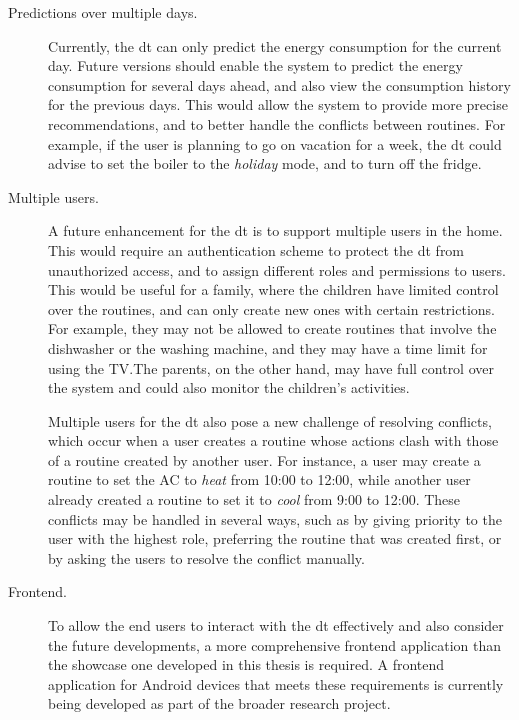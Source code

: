 \begin{description}
    \item[Predictions over multiple days.] Currently, the \acrshort{dt} can only predict the energy consumption for the current day. Future versions should enable the system to predict the energy consumption for several days ahead, and also view the consumption history for the previous days. This would allow the system to provide more precise recommendations, and to better handle the conflicts between routines. For example, if the user is planning to go on vacation for a week, the \acrshort{dt} could advise to set the boiler to the \textit{holiday} mode, and to turn off the fridge.

    \item[Multiple users.] A future enhancement for the \acrshort{dt} is to support multiple users in the home. This would require an authentication scheme to protect the \acrshort{dt} from unauthorized access, and to assign different roles and permissions to users. This would be useful for a family, where the children have limited control over the routines, and can only create new ones with certain restrictions. For example, they may not be allowed to create routines that involve the dishwasher or the washing machine, and they may have a time limit for using the TV.\@ The parents, on the other hand, may have full control over the system and could also monitor the children's activities.

    Multiple users for the \acrshort{dt} also pose a new challenge of resolving conflicts, which occur when a user creates a routine whose actions clash with those of a routine created by another user. For instance, a user may create a routine to set the AC to \textit{heat} from 10:00 to 12:00, while another user already created a routine to set it to \textit{cool} from 9:00 to 12:00. These conflicts may be handled in several ways, such as by giving priority to the user with the highest role, preferring the routine that was created first, or by asking the users to resolve the conflict manually.

    \item[Frontend.] To allow the end users to interact with the \acrshort{dt} effectively and also consider the future developments, a more comprehensive frontend application than the showcase one developed in this thesis is required. A frontend application for Android devices that meets these requirements is currently being developed as part of the broader research project.
\end{description}

